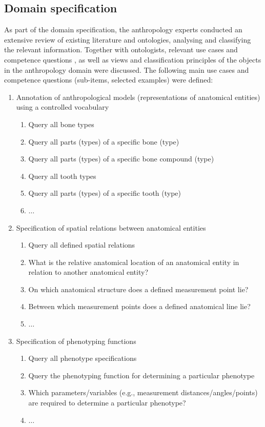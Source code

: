 \documentclass[sw]{iosart2x}
\begin{document}
\subsection{Domain specification}
As part of the domain specification, the anthropology experts conducted an extensive review of existing literature and ontologies, analysing and classifying the relevant information.
Together with ontologists, relevant use cases and competence questions\footnotemark{} \citep{XD2016, MOMo2023}, as well as views and classification principles of the objects in the anthropology domain \citep{herre2010} were discussed.
%
The following main use cases and competence questions (sub-items, selected examples) were defined:
\begin{enumerate}
\item Annotation of anthropological models (representations of anatomical entities) using a controlled vocabulary
\begin{enumerate}
\item Query all bone types
\item Query all parts (types) of a specific bone (type)
\item Query all parts (types) of a specific bone compound (type)
\item Query all tooth types
\item Query all parts (types) of a specific tooth (type)
\item $\ldots$
\end{enumerate}
\item Specification of spatial relations between anatomical entities
\begin{enumerate}
\item Query all defined spatial relations
\item What is the relative anatomical location of an anatomical entity in relation to another anatomical entity?
\item On which anatomical structure does a defined measurement point lie?
\item Between which measurement points does a defined anatomical line lie?
\item $\ldots$
\end{enumerate}
\item Specification of phenotyping functions
\begin{enumerate}
\item Query all phenotype specifications
\item Query the phenotyping function for determining a particular phenotype
\item Which parameters/variables (e.g., measurement distances/angles/points) are required to determine a particular phenotype?
\item $\ldots$
\end{enumerate}
\end{enumerate}
\end{document}
